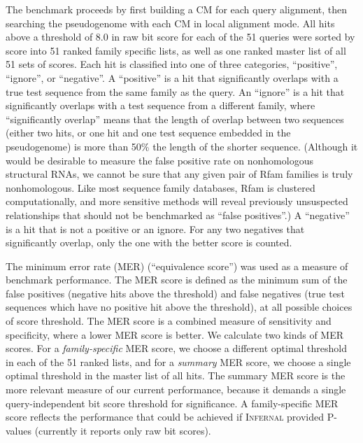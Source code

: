 \documentclass[11pt]{article}
\newif\ifdraft
\begin{document}
\ifdraft

\fi

The benchmark proceeds by first building a CM for each query
alignment, then searching the pseudogenome with each CM in local
alignment mode. All hits above a threshold of 8.0 in raw bit score for
each of the 51 queries were sorted by score into 51 ranked family
specific lists, as well as one ranked master list of all 51 sets of
scores.  Each hit is classified into one of three categories,
``positive'', ``ignore'', or ``negative''. A ``positive'' is a hit
that significantly overlaps with a true test sequence from the same
family as the query.  An ``ignore'' is a hit that significantly
overlaps with a test sequence from a different family, where
``significantly overlap'' means that the length of overlap between two
sequences (either two hits, or one hit and one test sequence embedded
in the pseudogenome) is more than 50\% the length of the shorter
sequence.  (Although it would be desirable to measure the false
positive rate on nonhomologous structural RNAs, we cannot be sure that
any given pair of Rfam families is truly nonhomologous. Like most
sequence family databases, Rfam is clustered computationally, and more
sensitive methods will reveal previously unsuspected relationships
that should not be benchmarked as ``false positives''.)  A
``negative'' is a hit that is not a positive or an ignore. For any two
negatives that significantly overlap, only the one with the better
score is counted.

The minimum error rate (MER) (``equivalence score'') \cite{Pearson95}
was used as a measure of benchmark performance. The MER score is
defined as the minimum sum of the false positives (negative hits above
the threshold) and false negatives (true test sequences which have no
positive hit above the threshold), at all possible choices of score
threshold. The MER score is a combined measure of sensitivity and
specificity, where a lower MER score is better. We calculate two kinds
of MER scores. For a \emph{family-specific} MER score, we choose a
different optimal threshold in each of the 51 ranked lists, and for a
\emph{summary} MER score, we choose a single optimal threshold in the
master list of all hits. The summary MER score is the more relevant
measure of our current performance, because it demands a single
query-independent bit score threshold for significance. A
family-specific MER score reflects the performance that could be
achieved if \textsc{Infernal} provided P-values (currently it reports
only raw bit scores).
\end{document}
